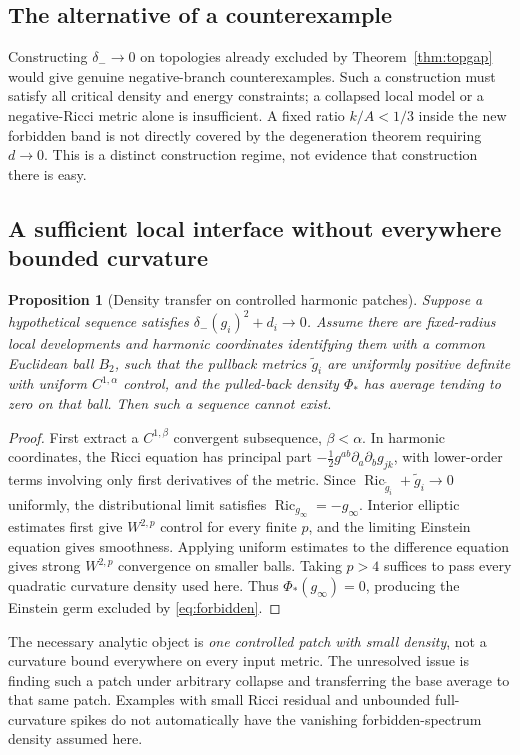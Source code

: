 \documentclass[a4paper,11pt]{article}
\numberwithin{equation}{section}
\newtheorem{proposition}[theorem]{Proposition}
\theoremstyle{definition}
\newcommand{\Ric}{\operatorname{Ric}}
\begin{document}
\subsection{The alternative of a counterexample}
Constructing $\delta_-\to0$ on topologies already excluded by Theorem~\ref{thm:topgap} would give genuine negative-branch counterexamples. Such a construction must satisfy all critical density and energy constraints; a collapsed local model or a negative-Ricci metric alone is insufficient. A fixed ratio $k/A<1/3$ inside the new forbidden band is not directly covered by the degeneration theorem requiring $d\to0$. This is a distinct construction regime, not evidence that construction there is easy.


\subsection{A sufficient local interface without everywhere bounded curvature}
\begin{proposition}[Density transfer on controlled harmonic patches]\label{prop:minimalbridge}
Suppose a hypothetical sequence satisfies $\delta_-(g_i)^2+d_i\to0$. Assume there are fixed-radius local developments and harmonic coordinates identifying them with a common Euclidean ball $B_2$, such that the pullback metrics $\widetilde g_i$ are uniformly positive definite with uniform $C^{1,\alpha}$ control, and the pulled-back density $\Phi_*$ has average tending to zero on that ball. Then such a sequence cannot exist.
\end{proposition}
\begin{proof}
First extract a $C^{1,\beta}$ convergent subsequence, $\beta<\alpha$. In harmonic coordinates, the Ricci equation has principal part $-\frac12 g^{ab}\partial_a\partial_b g_{jk}$, with lower-order terms involving only first derivatives of the metric. Since $\Ric_{\widetilde g_i}+\widetilde g_i\to0$ uniformly, the distributional limit satisfies $\Ric_{g_\infty}=-g_\infty$. Interior elliptic estimates first give $W^{2,p}$ control for every finite $p$, and the limiting Einstein equation gives smoothness. Applying uniform estimates to the difference equation gives strong $W^{2,p}$ convergence on smaller balls. Taking $p>4$ suffices to pass every quadratic curvature density used here. Thus $\Phi_*(g_\infty)=0$, producing the Einstein germ excluded by \eqref{eq:forbidden}.
\end{proof}
The necessary analytic object is \emph{one controlled patch with small density}, not a curvature bound everywhere on every input metric. The unresolved issue is finding such a patch under arbitrary collapse and transferring the base average to that same patch. Examples with small Ricci residual and unbounded full-curvature spikes do not automatically have the vanishing forbidden-spectrum density assumed here.
\end{document}
